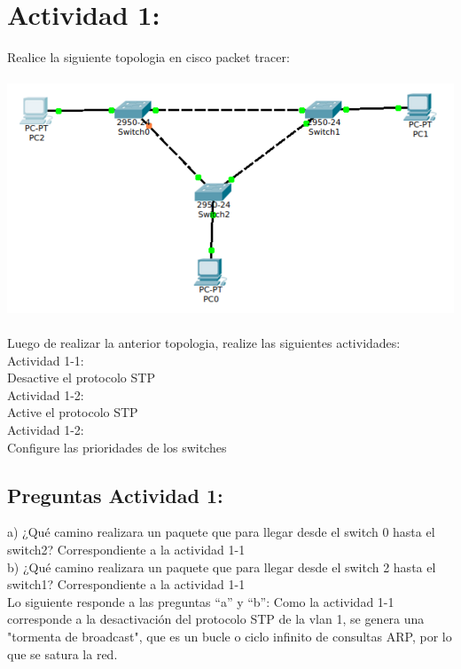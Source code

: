 \documentclass{article}
\begin{document}
\section{Actividad 1:}
Realice la siguiente topologia en cisco packet tracer:\\\\
\includegraphics[scale=0.5]{stp.PNG}\\\\
Luego de realizar la anterior topologia, realize las siguientes actividades:\\
Actividad 1-1:\\
Desactive el protocolo STP\\
Actividad 1-2:\\
Active el protocolo STP\\
Actividad 1-2:\\
Configure las prioridades de los switches\\

\subsection{Preguntas Actividad 1:}
a) ¿Qué camino realizara un paquete que para llegar desde el switch 0 hasta el
switch2? Correspondiente a la actividad 1-1\\
b) ¿Qué camino realizara un paquete que para llegar desde el switch 2 hasta el
switch1? Correspondiente a la actividad 1-1\\

Lo siguiente responde a las preguntas “a” y “b”: Como la actividad 1-1 corresponde a la desactivación del protocolo STP de la vlan 1, se genera una "tormenta de broadcast", que es un bucle o ciclo infinito de consultas ARP, por lo que se satura la red.\\\\\\\\\\
\end{document}
